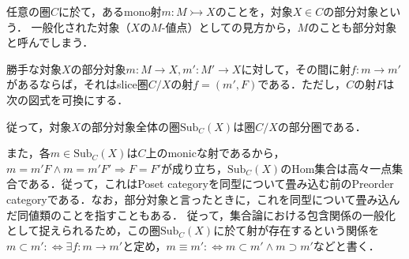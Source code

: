 \documentclass[uplatex, dvipdfmx]{jsarticle}
\begin{document}
\begin{definition}[Subobject]
    任意の圏$C$に於て，あるmono射$m:M\rightarrowtail X$のことを，対象$X\in C$の部分対象という．
    一般化された対象（$X$の$M$-値点）としての見方から，$M$のことも部分対象と呼んでしまう．
\end{definition}
\begin{remark}[対象$X$の部分対象全体は圏をなす．]
    勝手な対象$X$の部分対象$m:M\to X,m':M'\to X$に対して，その間に射$f:m\to m'$があるならば，それはslice圏$C/X$の射$f=(m',F)$である．ただし，$C$の射$F$は次の図式を可換にする．
    \begin{center}
    \end{center}
    従って，対象$X$の部分対象全体の圏$\mathrm{Sub}_C(X)$は圏$C/X$の部分圏である．

    また，各$m\in \mathrm{Sub}_C(X)$は$C$上のmonicな射であるから，$m=m'F\land m=m'F'\Rightarrow F=F'$が成り立ち，$\mathrm{Sub}_C(X)$のHom集合は高々一点集合である．従って，これはPoset categoryを同型について畳み込む前のPreorder categoryである．なお，部分対象と言ったときに，これを同型について畳み込んだ同値類のことを指すこともある．
    従って，集合論における包含関係の一般化として捉えられるため，この圏$\mathrm{Sub}_C(X)$に於て射が存在するという関係を$m\subset m':\Leftrightarrow \exists f:m\to m'$と定め，$m \equiv m':\Leftrightarrow m\subset m'\land m\supset m'$などと書く．
\end{remark}
\end{document}

